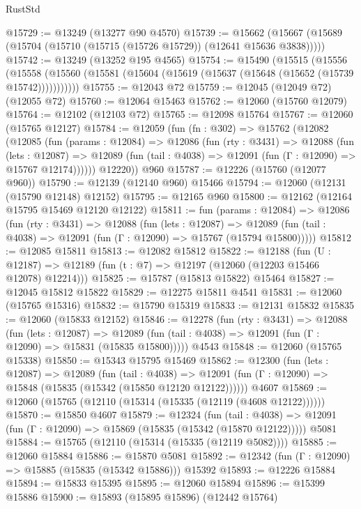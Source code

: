 \begin{lexlean}{RustStd}
\begin{coremodule}
@15729 := @13249 (@13277 @90 @4570)
@15739 := @15662 (@15667 (@15689 (@15704 (@15710 (@15715 (@15726 @15729)) (@12641 @15636 @3838)))))
@15742 := @13249 (@13252 @195 @4565)
@15754 := @15490
    (@15515
      (@15556
        (@15558 (@15560 (@15581 (@15604 (@15619 (@15637 (@15648 (@15652 (@15739 @15742)))))))))))
@15755 := @12043 @72
@15759 := @12045 (@12049 @72) (@12055 @72)
@15760 := @12064 @15463
@15762 := @12060 (@15760 @12079)
@15764 := @12102 (@12103 @72)
@15765 := @12098 @15764
@15767 := @12060 (@15765 @12127)
@15784 := @12059
    (fun (fn : @302) =>
    @15762
      (@12082
        (@12085
          (fun (params : @12084) =>
          @12086
            (fun (rty : @3431) =>
            @12088
              (fun (lets : @12087) =>
              @12089 (fun (tail : @4038) => @12091 (fun (Γ : @12090) => @15767 @12174))))))
        @12220))
    @960
@15787 := @12226 (@15760 (@12077 @960))
@15790 := @12139 (@12140 @960) @15466
@15794 := @12060 (@12131 (@15790 @12148) @12152)
@15795 := @12165 @960
@15800 := @12162 (@12164 @15795 @15469 @12120 @12122)
@15811 := fun (params : @12084) =>
  @12086
    (fun (rty : @3431) =>
    @12088
      (fun (lets : @12087) =>
      @12089 (fun (tail : @4038) => @12091 (fun (Γ : @12090) => @15767 (@15794 @15800)))))
@15812 := @12085 @15811
@15813 := @12082 @15812
@15822 := @12188
    (fun (U : @12187) => @12189 (fun (t : @7) => @12197 (@12060 (@12203 @15466 @12078) @12214)))
@15825 := @15787 (@15813 @15822) @15464
@15827 := @12045 @15812 @15822
@15829 := @12275 @15811 @4541
@15831 := @12060 (@15765 @15316)
@15832 := @15790 @15319
@15833 := @12131 @15832
@15835 := @12060 (@15833 @12152)
@15846 := @12278
    (fun (rty : @3431) =>
    @12088
      (fun (lets : @12087) =>
      @12089 (fun (tail : @4038) => @12091 (fun (Γ : @12090) => @15831 (@15835 @15800)))))
    @4543
@15848 := @12060 (@15765 @15338)
@15850 := @15343 @15795 @15469
@15862 := @12300
    (fun (lets : @12087) =>
    @12089
      (fun (tail : @4038) =>
      @12091 (fun (Γ : @12090) => @15848 (@15835 (@15342 (@15850 @12120 @12122))))))
    @4607
@15869 := @12060 (@15765 (@12110 (@15314 (@15335 (@12119 (@4608 @12122))))))
@15870 := @15850 @4607
@15879 := @12324
    (fun (tail : @4038) => @12091 (fun (Γ : @12090) => @15869 (@15835 (@15342 (@15870 @12122)))))
    @5081
@15884 := @15765 (@12110 (@15314 (@15335 (@12119 @5082))))
@15885 := @12060 @15884
@15886 := @15870 @5081
@15892 := @12342 (fun (Γ : @12090) => @15885 (@15835 (@15342 @15886))) @15392
@15893 := @12226 @15884
@15894 := @15833 @15395
@15895 := @12060 @15894
@15896 := @15399 @15886
@15900 := @15893 (@15895 @15896) (@12442 @15764)

\end{coremodule}
\end{lexlean}
